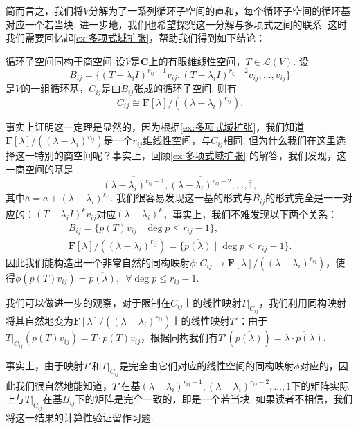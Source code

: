 简而言之，我们将$V$分解为了一系列循环子空间的直和，每个循环子空间的循环基对应一个若当块. 进一步地，我们也希望探究这一分解与多项式之间的联系. 这时我们需要回忆起\autoref{ex:多项式域扩张}，帮助我们得到如下结论：
\begin{theorem}{}{循环子空间同构于商空间}
    设$V$是$\mathbf{C}$上的有限维线性空间，$T\in\mathcal{L}(V)$. 设
    \[B_{ij}=\{(T-\lambda_iI)^{r_{ij}-1}v_{ij},(T-\lambda_iI)^{r_{ij}-2}v_{ij},\ldots,v_{ij}\}\]
    是$V$的一组循环基，$C_{ij}$是由$B_{ij}$张成的循环子空间. 则有
    \[C_{ij}\cong \mathbf{F}[\lambda]/((\lambda-\lambda_i)^{r_{ij}}).\]
\end{theorem}

事实上证明这一定理是显然的，因为根据\autoref{ex:多项式域扩张}，我们知道$\mathbf{F}[\lambda]/((\lambda-\lambda_i)^{r_{ij}})$是一个$r_{ij}$维线性空间，与$C_{ij}$相同. 但为什么我们在这里选择这一特别的商空间呢？事实上，回顾\autoref{ex:多项式域扩张} 的解答，我们发现，这一商空间的基是
\[\overline{(\lambda-\lambda_i)^{r_{ij}-1}},\overline{(\lambda-\lambda_i)^{r_{ij}-2}},\ldots,\overline{1},\]
其中$\overline{a}=a+(\lambda-\lambda_i)^{r_{ij}}$. 我们很容易发现这一基的形式与$B_{ij}$的形式完全是一一对应的：$(T-\lambda_iI)^kv_{ij}$对应$\overline{(\lambda-\lambda_i)^k}$，事实上，我们不难发现以下两个关系：
\begin{gather*}
    B_{ij}=\{p(T)v_{ij}\mid \deg p\leqslant r_{ij}-1\},\\
    \mathbf{F}[\lambda]/((\lambda-\lambda_i)^{r_{ij}})=\{\overline{p(\lambda)}\mid \deg p\leqslant r_{ij}-1\}.
\end{gather*}
因此我们能构造出一个非常自然的同构映射$\phi:C_{ij}\to \mathbf{F}[\lambda]/((\lambda-\lambda_i)^{r_{ij}})$，使得$\phi(p(T)v_{ij})=\overline{p(\lambda)},\enspace\forall \deg p\leqslant r_{ij}-1$.

我们可以做进一步的观察，对于限制在$C_{ij}$上的线性映射$T|_{C_{ij}}$，我们利用同构映射将其自然地变为$\mathbf{F}[\lambda]/((\lambda-\lambda_i)^{r_{ij}})$上的线性映射$T'$：由于$T|_{C_{ij}}(p(T)v_{ij})=T\cdot p(T)v_{ij}$，根据同构我们有$T'(\overline{p(\lambda)})=\overline{\lambda\cdot p(\lambda)}$.

事实上，由于映射$T'$和$T|_{C_{ij}}$是完全由它们对应的线性空间的同构映射$\phi$对应的，因此我们很自然地能知道，$T'$在基$\overline{(\lambda-\lambda_i)^{r_{ij}-1}},\overline{(\lambda-\lambda_i)^{r_{ij}-2}},\ldots,\overline{1}$下的矩阵实际上与$T|_{C_{ij}}$在基$B_{ij}$下的矩阵是完全一致的，即是一个若当块. 如果读者不相信，我们将这一结果的计算性验证留作习题.

